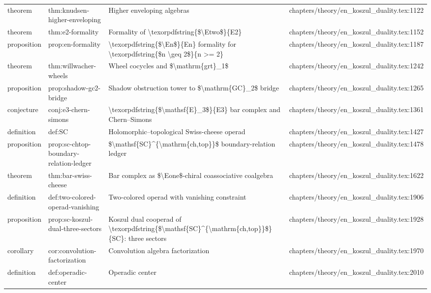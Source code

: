 \documentclass[11pt]{article}
\begin{document}
\begin{longtable}{L{0.10\textwidth}L{0.26\textwidth}L{0.42\textwidth}L{0.22\textwidth}}
theorem & thm:knudsen-higher-enveloping & Higher enveloping algebras & chapters/theory/en\_koszul\_duality.tex:1122\\
theorem & thm:e2-formality & Formality of \textbackslash{}texorpdfstring\{\$\textbackslash{}Etwo\$\}\{E2\} & chapters/theory/en\_koszul\_duality.tex:1152\\
proposition & prop:en-formality & \textbackslash{}texorpdfstring\{\$\textbackslash{}En\$\}\{En\} formality for \textbackslash{}texorpdfstring\{\$n \textbackslash{}geq 2\$\}\{n >= 2\} & chapters/theory/en\_koszul\_duality.tex:1187\\
theorem & thm:willwacher-wheels & Wheel cocycles and \$\textbackslash{}mathrm\{grt\}\_1\$ & chapters/theory/en\_koszul\_duality.tex:1242\\
proposition & prop:shadow-gc2-bridge & Shadow obstruction tower to \$\textbackslash{}mathrm\{GC\}\_2\$ bridge & chapters/theory/en\_koszul\_duality.tex:1265\\
conjecture & conj:e3-chern-simons & \textbackslash{}texorpdfstring\{\$\textbackslash{}mathsf\{E\}\_3\$\}\{E3\} bar complex and Chern--Simons & chapters/theory/en\_koszul\_duality.tex:1361\\
definition & def:SC & Holomorphic--topological Swiss-cheese operad & chapters/theory/en\_koszul\_duality.tex:1427\\
proposition & prop:sc-chtop-boundary-relation-led{}ger & \$\textbackslash{}mathsf\{SC\}\textasciicircum{}\{\textbackslash{}mathrm\{ch,top\}\}\$ boundary-relation led{}ger & chapters/theory/en\_koszul\_duality.tex:1478\\
theorem & thm:bar-swiss-cheese & Bar complex as \$\textbackslash{}Eone\$-chiral coassociative coalgebra & chapters/theory/en\_koszul\_duality.tex:1622\\
definition & def:two-colored-operad-vanishing & Two-colored operad with vanishing constraint & chapters/theory/en\_koszul\_duality.tex:1906\\
proposition & prop:sc-koszul-dual-three-sectors & Koszul dual cooperad of \textbackslash{}texorpdfstring\{\$\textbackslash{}mathsf\{SC\}\textasciicircum{}\{\textbackslash{}mathrm\{ch,top\}\}\$\}\{SC\}: three sectors & chapters/theory/en\_koszul\_duality.tex:1928\\
corollary & cor:convolution-factorization & Convolution algebra factorization & chapters/theory/en\_koszul\_duality.tex:1970\\
definition & def:operadic-center & Operadic center & chapters/theory/en\_koszul\_duality.tex:2010\\

\end{longtable}
\end{document}
